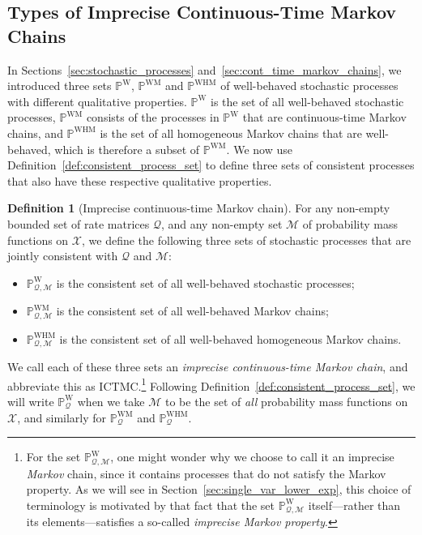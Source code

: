 \documentclass[10pt,a4paper]{paper}
\theoremstyle{definition}
\newtheorem{definition}{Definition}
\newcommand{\states}{\mathcal{X}}
\newcommand{\processes}{\mathbb{P}}
\newcommand{\wprocesses}{\processes^{\mathrm{W}}}
\newcommand{\wmprocesses}{\processes^{\mathrm{WM}}}
\newcommand{\whmprocesses}{\processes^{\mathrm{WHM}}}
\newcommand{\rateset}{\mathcal{Q}}
\newcommand{\ictmc}{{ICTMC}}
\begin{document}
\subsection{Types of Imprecise Continuous-Time Markov Chains}\label{subsec:types_ictmc}

In Sections~\ref{sec:stochastic_processes} and~\ref{sec:cont_time_markov_chains}, we introduced three sets $\wprocesses$, $\wmprocesses$ and $\whmprocesses$ of well-behaved stochastic processes with different qualitative properties. $\wprocesses$ is the set of all well-behaved stochastic processes, $\wmprocesses$ consists of the processes in $\wprocesses$ that are continuous-time Markov chains, and $\whmprocesses$ is the set of all homogeneous Markov chains that are well-behaved, which is therefore a subset of $\wmprocesses$. We now use Definition~\ref{def:consistent_process_set} to define three sets of consistent processes that also have these respective qualitative properties. 

\begin{definition}[Imprecise continuous-time Markov chain]\label{def:process_sets}
For any non-empty bounded set of rate matrices $\rateset$, and any non-empty set $\mathcal{M}$ of probability mass functions on $\states$, we define the following three sets of stochastic processes that are jointly consistent with $\rateset$ and $\mathcal{M}$:
\begin{itemize}
\item $\wprocesses_{\rateset,\mathcal{M}}$ is the consistent set of all well-behaved stochastic processes;
\item $\wmprocesses_{\rateset,\mathcal{M}}$ is the consistent set of all well-behaved Markov chains;
\item $\whmprocesses_{\rateset,\mathcal{M}}$ is the consistent set of all well-behaved homogeneous Markov chains.
\end{itemize}
We call each of these three sets 
 an \emph{imprecise continuous-time Markov chain}, and abbreviate this as \ictmc.\footnote{For the set $\wprocesses_{\rateset,\mathcal{M}}$, one might wonder why we choose to call it an imprecise \emph{Markov} chain, since it contains processes that do not satisfy the Markov property. As we will see in Section~\ref{sec:single_var_lower_exp}, this choice of terminology is motivated by that fact that the set $\wprocesses_{\rateset,\mathcal{M}}$ itself---rather than its elements---satisfies a so-called \emph{imprecise Markov property}.} 
Following Definition~\ref{def:consistent_process_set}, we will write $\wprocesses_{\rateset}$ when we take $\mathcal{M}$ to be the set of \emph{all} probability mass functions on $\states$, and similarly for $\wmprocesses_{\rateset}$ and $\whmprocesses_{\rateset}$.
\end{definition}
\end{document}

